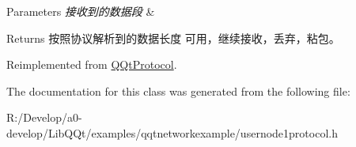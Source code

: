 \begin{DoxyParams}{Parameters}
{\em 接收到的数据段} & \\
\hline
\end{DoxyParams}
\begin{DoxyReturn}{Returns}
按照协议解析到的数据长度 可用，继续接收，丢弃，粘包。 
\end{DoxyReturn}


Reimplemented from \mbox{\hyperlink{class_q_qt_protocol_a00fd0c1ac23379ed3b9b25da9a34f39b}{Q\+Qt\+Protocol}}.



The documentation for this class was generated from the following file\+:\begin{DoxyCompactItemize}
\item 
R\+:/\+Develop/a0-\/develop/\+Lib\+Q\+Qt/examples/qqtnetworkexample/usernode1protocol.\+h\end{DoxyCompactItemize}

